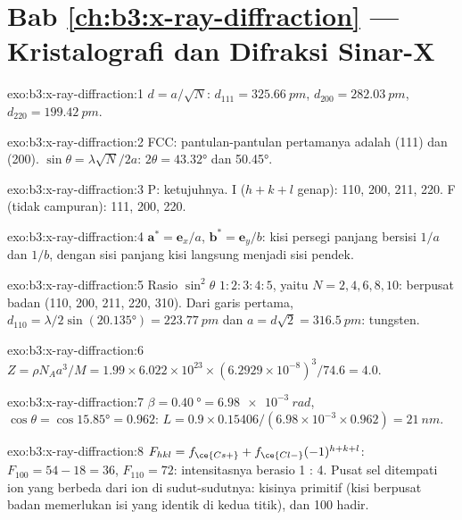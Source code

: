 \section*{Bab \ref{ch:b3:x-ray-diffraction} --- Kristalografi dan Difraksi Sinar-X}

\begin{solution}{exo:b3:x-ray-diffraction:1}
$d = a/\sqrt N$: $d_{111} = \qty{325.66}{pm}$, $d_{200} = \qty{282.03}{pm}$, $d_{220} =
\qty{199.42}{pm}$.
\end{solution}

\begin{solution}{exo:b3:x-ray-diffraction:2}
FCC: pantulan-pantulan pertamanya adalah (111) dan (200).
$\sin\theta = \lambda\sqrt N/2a$: $2\theta =
\ang{43.32}$ dan \ang{50.45}.
\end{solution}

\begin{solution}{exo:b3:x-ray-diffraction:3}
P: ketujuhnya. I ($h + k + l$ genap): 110, 200, 211, 220. F (tidak campuran): 111, 200, 220.
\end{solution}

\begin{solution}{exo:b3:x-ray-diffraction:4}
$\mathbf a^* = \mathbf e_x/a$, $\mathbf b^* = \mathbf e_y/b$: kisi persegi panjang bersisi
$1/a$ dan $1/b$, dengan sisi panjang kisi langsung menjadi sisi pendek.
\end{solution}

\begin{solution}{exo:b3:x-ray-diffraction:5}
Rasio $\sin^2\theta$ $1 : 2 : 3 : 4 : 5$, yaitu $N = 2, 4, 6, 8, 10$: berpusat badan
(110, 200, 211, 220, 310). Dari garis pertama, $d_{110} = \lambda/2\sin(\ang{20.135}) =
\qty{223.77}{pm}$ dan $a = d\sqrt2 = \qty{316.5}{pm}$: tungsten.
\end{solution}

\begin{solution}{exo:b3:x-ray-diffraction:6}
$Z = \rho N_Aa^3/M = 1.99 \times 6.022\times10^{23} \times (6.2929\times10^{-8})^3/74.6 = 4.0$.
\end{solution}

\begin{solution}{exo:b3:x-ray-diffraction:7}
$\beta = \qty{0.40}{\degree} = \qty{6.98e-3}{rad}$, $\cos\theta = \cos\ang{15.85} = 0.962$:
$L = 0.9 \times 0.15406/(6.98\times10^{-3} \times 0.962) = \qty{21}{nm}$.
\end{solution}

\begin{solution}{exo:b3:x-ray-diffraction:8}
$F_{hkl} = f_{\ce{Cs+}} + f_{\ce{Cl-}}(-1)^{h+k+l}$: $F_{100} = 54 - 18 = 36$, $F_{110} = 72$:
intensitasnya berasio 1 : 4. Pusat sel ditempati ion yang berbeda dari ion di
sudut-sudutnya: kisinya primitif (kisi berpusat badan memerlukan isi yang
identik di kedua titik), dan 100 hadir.
\end{solution}

